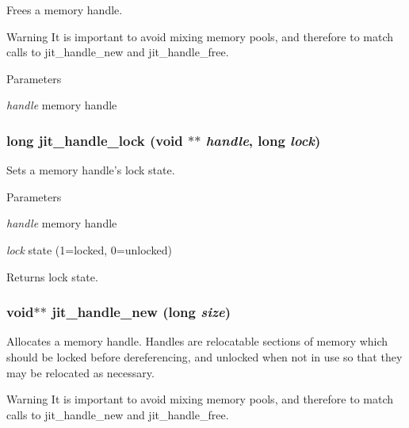 Frees a memory handle. \begin{DoxyWarning}{Warning}
It is important to avoid mixing memory pools, and therefore to match calls to jit\_\-handle\_\-new and jit\_\-handle\_\-free.
\end{DoxyWarning}

\begin{DoxyParams}{Parameters}
\item[{\em handle}]memory handle \end{DoxyParams}
\hypertarget{group__memorymod_ga8beac43ecbe453e810b373739bbf1483}{
\subsubsection[{jit\_\-handle\_\-lock}]{\setlength{\rightskip}{0pt plus 5cm}long jit\_\-handle\_\-lock (void $\ast$$\ast$ {\em handle}, \/  long {\em lock})}}
\label{group__memorymod_ga8beac43ecbe453e810b373739bbf1483}


Sets a memory handle's lock state. 
\begin{DoxyParams}{Parameters}
\item[{\em handle}]memory handle \item[{\em lock}]state (1=locked, 0=unlocked)\end{DoxyParams}
\begin{DoxyReturn}{Returns}
lock state. 
\end{DoxyReturn}
\hypertarget{group__memorymod_ga09f5e82fafd1de78638c36105860a635}{
\subsubsection[{jit\_\-handle\_\-new}]{\setlength{\rightskip}{0pt plus 5cm}void$\ast$$\ast$ jit\_\-handle\_\-new (long {\em size})}}
\label{group__memorymod_ga09f5e82fafd1de78638c36105860a635}


Allocates a memory handle. Handles are relocatable sections of memory which should be locked before dereferencing, and unlocked when not in use so that they may be relocated as necessary.

\begin{DoxyWarning}{Warning}
It is important to avoid mixing memory pools, and therefore to match calls to jit\_\-handle\_\-new and jit\_\-handle\_\-free.
\end{DoxyWarning}

